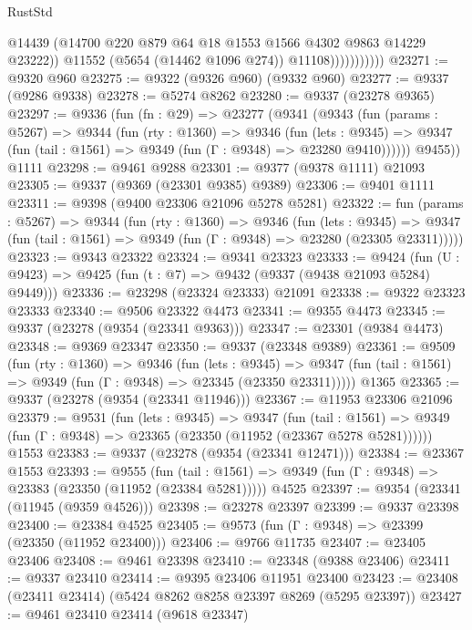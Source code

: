 \begin{lexlean}{RustStd}
\begin{coremodule}
                            @14439
                            (@14700 @220 @879 @64 @18 @1553 @1566 @4302 @9863 @14229 @23222))
                          @11552
                          (@5654 (@14462 @1096 @274))
                          @11108)))))))))))
@23271 := @9320 @960
@23275 := @9322 (@9326 @960) (@9332 @960)
@23277 := @9337 (@9286 @9338)
@23278 := @5274 @8262
@23280 := @9337 (@23278 @9365)
@23297 := @9336
    (fun (fn : @29) =>
    @23277
      (@9341
        (@9343
          (fun (params : @5267) =>
          @9344
            (fun (rty : @1360) =>
            @9346
              (fun (lets : @9345) =>
              @9347 (fun (tail : @1561) => @9349 (fun (Γ : @9348) => @23280 @9410))))))
        @9455))
    @1111
@23298 := @9461 @9288
@23301 := @9377 (@9378 @1111) @21093
@23305 := @9337 (@9369 (@23301 @9385) @9389)
@23306 := @9401 @1111
@23311 := @9398 (@9400 @23306 @21096 @5278 @5281)
@23322 := fun (params : @5267) =>
  @9344
    (fun (rty : @1360) =>
    @9346
      (fun (lets : @9345) =>
      @9347 (fun (tail : @1561) => @9349 (fun (Γ : @9348) => @23280 (@23305 @23311)))))
@23323 := @9343 @23322
@23324 := @9341 @23323
@23333 := @9424
    (fun (U : @9423) => @9425 (fun (t : @7) => @9432 (@9337 (@9438 @21093 @5284) @9449)))
@23336 := @23298 (@23324 @23333) @21091
@23338 := @9322 @23323 @23333
@23340 := @9506 @23322 @4473
@23341 := @9355 @4473
@23345 := @9337 (@23278 (@9354 (@23341 @9363)))
@23347 := @23301 (@9384 @4473)
@23348 := @9369 @23347
@23350 := @9337 (@23348 @9389)
@23361 := @9509
    (fun (rty : @1360) =>
    @9346
      (fun (lets : @9345) =>
      @9347 (fun (tail : @1561) => @9349 (fun (Γ : @9348) => @23345 (@23350 @23311)))))
    @1365
@23365 := @9337 (@23278 (@9354 (@23341 @11946)))
@23367 := @11953 @23306 @21096
@23379 := @9531
    (fun (lets : @9345) =>
    @9347
      (fun (tail : @1561) =>
      @9349 (fun (Γ : @9348) => @23365 (@23350 (@11952 (@23367 @5278 @5281))))))
    @1553
@23383 := @9337 (@23278 (@9354 (@23341 @12471)))
@23384 := @23367 @1553
@23393 := @9555
    (fun (tail : @1561) => @9349 (fun (Γ : @9348) => @23383 (@23350 (@11952 (@23384 @5281)))))
    @4525
@23397 := @9354 (@23341 (@11945 (@9359 @4526)))
@23398 := @23278 @23397
@23399 := @9337 @23398
@23400 := @23384 @4525
@23405 := @9573 (fun (Γ : @9348) => @23399 (@23350 (@11952 @23400)))
@23406 := @9766 @11735
@23407 := @23405 @23406
@23408 := @9461 @23398
@23410 := @23348 (@9388 @23406)
@23411 := @9337 @23410
@23414 := @9395 @23406 @11951 @23400
@23423 := @23408 (@23411 @23414) (@5424 @8262 @8258 @23397 @8269 (@5295 @23397))
@23427 := @9461 @23410 @23414 (@9618 @23347)

\end{coremodule}
\end{lexlean}
